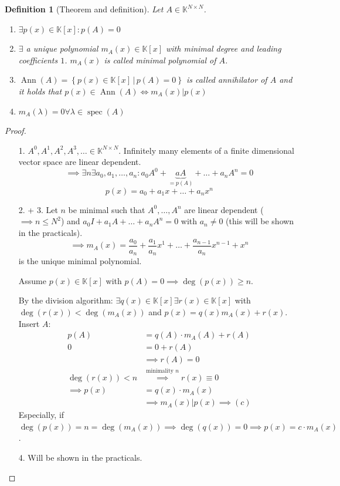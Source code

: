 \documentclass{article}
\newcounter{lecref}[section]
\numberwithin{lecref}{section}
\newtheorem{definition}[lecref]{Definition}
\newcommand{\setdef}[2]{\left\{\left.#1\,\right|\,#2\right\}}
\begin{document}
\begin{definition}[Theorem and definition] %
  Let $A \in \mathbb K^{N \times N}$.
  \begin{enumerate}
    \item $\exists p(x) \in \mathbb K[x]: p(A) = 0$
    \item $\exists$ a unique polynomial $m_A(x) \in \mathbb K[x]$ with minimal degree and leading coefficients $1$.
      $m_A(x)$ is called \emph{minimal polynomial of $A$}.
    \item $\operatorname{Ann}(A) = \setdef{p(x) \in \mathbb K[x]}{p(A) = 0}$ is called \emph{annihilator of $A$}
      and it holds that $p(x) \in \operatorname{Ann}(A) \iff m_A(x) | p(x)$
    \item $m_A(\lambda) = 0 \forall \lambda \in \operatorname{spec}(A)$
  \end{enumerate}
\end{definition}

\begin{proof}
  \begin{enumerate}
    \item[1.] $A^0, A^1, A^2, A^3, \dots \in \mathbb K^{N \times N}$.
      Infinitely many elements of a finite dimensional vector space are linear dependent.
      \[ \implies \exists n \exists a_0, a_1, \dots, a_n: a_0 A^0 + \underbrace{a A}_{= p(A)} + \dots + a_n A^n = 0 \]
      \[ p(x) = a_0 + a_1 x + \dots + a_n x^n \]
    \item[2. + 3.]
      Let $n$ be minimal such that $A^0, \dots, A^n$ are linear dependent ($\implies n \leq N^2$) and $a_0 I + a_1 A + \dots + a_n A^n = 0$ with $a_n \neq 0$ (this will be shown in the practicals).
      \[ \implies m_A(x) = \frac{a_0}{a_n} + \frac{a_1}{a_n} x^1 + \dots + \frac{a_{n-1}}{a_n} x^{n-1} + x^n \]
      is the unique minimal polynomial.

      Assume $p(x) \in \mathbb K[x]$ with $p(A) = 0 \implies \deg(p(x)) \geq n$.

      By the division algorithm: $\exists q(x) \in \mathbb K[x] \exists r(x) \in \mathbb K[x]$ with $\deg(r(x)) < \deg(m_A(x))$ and $p(x) = q(x) m_A(x) + r(x)$. Insert $A$:
      \begin{align*}
        p(A) &= q(A) \cdot m_A(A) + r(A) \\
        0 &= 0 + r(A) \\
        & \implies r(A) = 0 \\
        \deg(r(x)) < n & \overset{\text{minimality $n$}}\implies r(x) \equiv 0 \\
        \implies p(x) &= q(x) \cdot m_A(x) \\
          & \implies m_A(x) | p(x) \implies (c)
      \end{align*}
      Especially, if $\deg(p(x)) = n = \deg(m_A(x)) \implies \deg(q(x)) = 0 \implies p(x) = c \cdot m_A(x)$.
    \item[4.] Will be shown in the practicals.
  \end{enumerate}
\end{proof}
\end{document}
